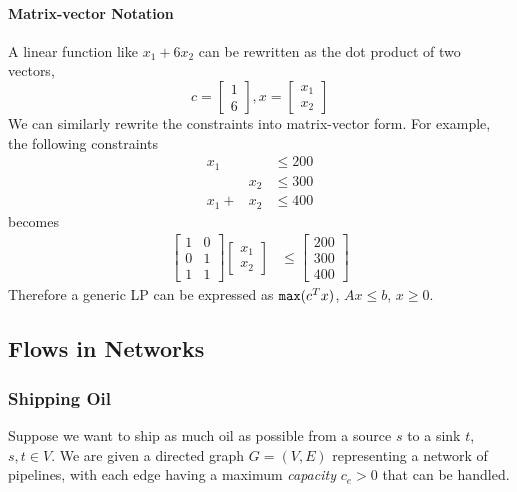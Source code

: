 \paragraph{Matrix-vector Notation}
A linear function like $x_1 + 6x_2$ can be rewritten as the dot product of two vectors,
\begin{equation*}
  c = \begin{bmatrix} 1 \\ 6 \end{bmatrix},
  x = \begin{bmatrix} x_1 \\ x_2 \end{bmatrix} 
\end{equation*}
We can similarly rewrite the constraints into matrix-vector form.
For example, the following constraints
\begin{align*}
  x_1 & & \leq 200 \\
      & x_2 & \leq 300\\
  x_1 + & x_2 & \leq 400
\end{align*}
becomes
\begin{align*}
  \begin{bmatrix} 1 & 0 \\ 0 & 1 \\ 1 & 1 \end{bmatrix}
  \begin{bmatrix} x_1 \\ x_2 \end{bmatrix} 
                      & \leq
  \begin{bmatrix} 200 \\ 300 \\ 400 \end{bmatrix} 
\end{align*}
Therefore a generic LP can be expressed as $\verb|max|(c^T x)$, $Ax \leq b$, $x \geq 0$.

\subsection{Flows in Networks}

\subsubsection{Shipping Oil}
Suppose we want to ship as much oil as possible from a source $s$ to a sink $t$, $s, t \in V$.
We are given a directed graph $G = (V, E)$ representing a network of pipelines, with each edge having a maximum \textit{capacity} $c_e > 0$ that can be handled.

